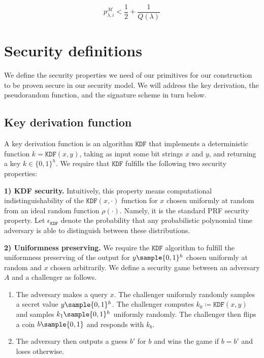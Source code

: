 \documentclass{article}
\begin{document}
$$
p_{\lambda,i}^{\mathcal M}<\frac{1}{2}+\frac{1}{Q(\lambda)}
$$

\section{Security definitions} \label{sec:def}

We define the security properties we need of our primitives for our construction to be proven secure in our security model. We will address the key derivation, the pseudorandom function, and the signature scheme in turn below.

\subsection{Key derivation function} \label{KDFdef}
A key derivation function is an algorithm $\texttt{KDF}$ that implements a deterministic function $k=\texttt{KDF}(x, y)$, taking as input some bit strings $x$ and $y$, and returning a key $k \in \{0,1\}^h$. We require that $\texttt{KDF}$ fulfills the following two security properties:

\textbf{1) KDF security.} Intuitively, this property means computational indistinguishability of the $\texttt{KDF}(x,\cdot)$ function for $x$ chosen uniformly at random from an ideal random function $\rho(\cdot)$. Namely, it is the standard PRF security property. 
Let $\epsilon_{\texttt{KDF}}$ denote the probability that any probabilistic polynomial time adversary is able to distinguish between these distributions.

\textbf{2) Uniformness preserving.} We require the $\texttt{KDF}$ algorithm to fulfill the uniformness preserving of the output for $y \sample \{0,1\}^h$ chosen uniformly at random and $x$ chosen arbitrarily. 
We define a security game between an adversary $A$ and a challenger as follows.

\begin{enumerate}
	\item The adversary makes a query $x$. The challenger uniformly randomly samples a secret value $y \sample \{0,1\}^h$. The challenger computes $k_0 \coloneqq \texttt{KDF}(x,y)$ and samples $k_1 \sample \{0,1\}^h$ uniformly randomly. The challenger then flips a coin $b \sample \{0, 1\}$ and responds with $k_b$.
	
	\item The adversary then outputs a guess $b'$ for $b$ and wins the game if $b = b'$ and loses otherwise.
\end{enumerate}
\end{document}
